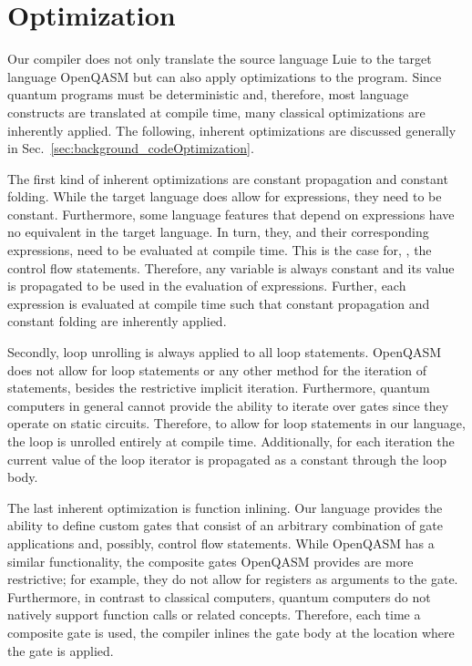 \section{Optimization}
Our compiler does not only translate the source language Luie to the target language OpenQASM but can also apply optimizations to the program. Since quantum programs must be deterministic and, therefore, most language constructs are translated at compile time, many classical optimizations are inherently applied. The following, inherent optimizations are discussed generally in Sec.~\ref{sec:background_codeOptimization}.

The first kind of inherent optimizations are constant propagation and constant folding. 
While the target language does allow for expressions, they need to be constant. Furthermore, some language features that depend on expressions have no equivalent in the target language. In turn, they, and their corresponding expressions, need to be evaluated at compile time. This is the case for, \eg, the control flow statements. Therefore, any variable is always constant and its value is propagated to be used in the evaluation of expressions. Further, each expression is evaluated at compile time such that constant propagation and constant folding are inherently applied.

Secondly, loop unrolling is always applied to all loop statements. OpenQASM does not allow for loop statements or any other method for the iteration of statements, besides the restrictive implicit iteration. Furthermore, quantum computers in general cannot provide the ability to iterate over gates since they operate on static circuits. Therefore, to allow for loop statements in our language, the loop is unrolled entirely at compile time. Additionally, for each iteration the current value of the loop iterator is propagated as a constant through the loop body.   

The last inherent optimization is function inlining. Our language provides the ability to define custom gates that consist of an arbitrary combination of gate applications and, possibly, control flow statements. While OpenQASM has a similar functionality, the composite gates OpenQASM provides are more restrictive; for example, they do not allow for registers as arguments to the gate. Furthermore, in contrast to classical computers, quantum computers do not natively support function calls or related concepts. Therefore, each time a composite gate is used, the compiler inlines the gate body at the location where the gate is applied.   

